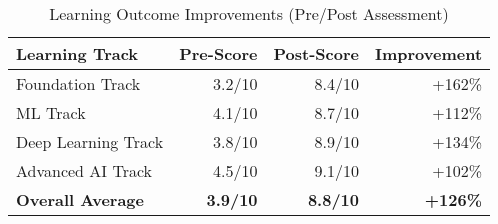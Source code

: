 \begin{table}[H]
\centering
\caption{Learning Outcome Improvements (Pre/Post Assessment)}
\label{tab:learning-outcomes}
\begin{tabular}{@{}lrrr@{}}
\toprule
\textbf{Learning Track} & \textbf{Pre-Score} & \textbf{Post-Score} & \textbf{Improvement} \\
\midrule
Foundation Track & 3.2/10 & 8.4/10 & +162\% \\
ML Track & 4.1/10 & 8.7/10 & +112\% \\
Deep Learning Track & 3.8/10 & 8.9/10 & +134\% \\
Advanced AI Track & 4.5/10 & 9.1/10 & +102\% \\
\midrule
\textbf{Overall Average} & \textbf{3.9/10} & \textbf{8.8/10} & \textbf{+126\%} \\
\bottomrule
\end{tabular}
\end{table}